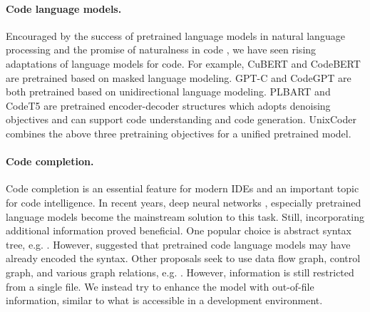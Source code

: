 \paragraph{Code language models.}
Encouraged by the success of pretrained language models in natural language processing \citep{devlin2019bert, liu2019roberta, lewis2019bart, raffel2020exploring} and the promise of naturalness in code \citep{hindle2016naturalness, allamanis2018survey}, we have seen rising adaptations of language models for code. For example, CuBERT \citep{kanade2020learning} and CodeBERT \citep{feng2020codebert} are pretrained based on masked language modeling. GPT-C \citep{svyatkovskiy2020intellicode} and CodeGPT \citep{lu2021codexglue} are both pretrained based on unidirectional language modeling. PLBART \citep{ahmad2021unified} and CodeT5 \citep{wang2021codet5} are pretrained encoder-decoder structures which adopts denoising objectives and can support code understanding and code generation. UnixCoder \citep{guo2022unixcoder} combines the above three pretraining objectives for a unified pretrained model. 




\paragraph{Code completion.}
Code completion is an essential feature for modern IDEs and an important topic for code intelligence. 
In recent years, deep neural networks \citep{liu2016neural, li2018code, alon2020structural, liu2020multi, kim2021code}, especially pretrained language models \citep{svyatkovskiy2020intellicode, lu2021codexglue} become the mainstream solution to this task. 
Still, incorporating additional information proved beneficial.
One popular choice is abstract syntax tree, e.g. \citet{kim2021code, peng2021could, guo2022unixcoder}. 
However, \citet{lopez2022ast} suggested that pretrained code language models may have already encoded the syntax.  
Other proposals seek to use data flow graph, control graph, and various graph relations, e.g. \citet{guo2020graphcodebert, hellendoorn2019global}.
However, information is still restricted from a single file.
We instead try to enhance the model with out-of-file information, similar to what is accessible in a development environment.

